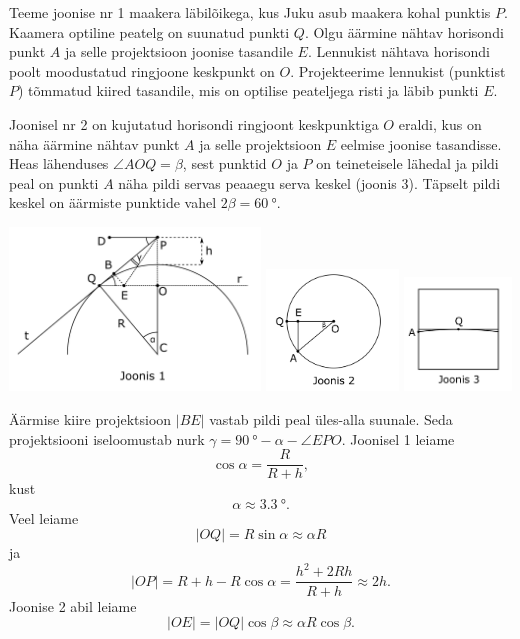 \documentclass[10pt]{article}
\begin{document}
Teeme joonise nr 1 maakera läbilõikega, kus Juku asub maakera kohal punktis $P$. Kaamera optiline peatelg on suunatud punkti $Q$. Olgu äärmine nähtav horisondi punkt $A$ ja selle projektsioon joonise tasandile $E$. Lennukist nähtava horisondi poolt moodustatud ringjoone keskpunkt on $O$. Projekteerime lennukist (punktist $P$) tõmmatud kiired tasandile, mis on optilise peateljega risti ja läbib punkti $E$.

Joonisel nr 2 on kujutatud horisondi ringjoont keskpunktiga $O$ eraldi, kus on näha äärmine nähtav punkt $A$ ja selle projektsioon $E$ eelmise joonise tasandisse. Heas lähenduses $\angle AOQ = \beta$, sest punktid $O$ ja $P$ on teineteisele lähedal ja pildi peal on punkti $A$ näha pildi servas peaaegu serva keskel (joonis 3). Täpselt pildi keskel on äärmiste punktide vahel $2\beta = \SI{60}{\degree}$.

\begin{center}
\includegraphics[width=0.50\textwidth]{2019-lahg-10-yl1.png}
\includegraphics[width=0.265\textwidth]{2019-lahg-10-yl2.png}
\includegraphics[width=0.215\textwidth]{2019-lahg-10-yl3.png}
\end{center}

Äärmise kiire projektsioon $|BE|$ vastab pildi peal üles-alla suunale. Seda projektsiooni iseloomustab nurk $\gamma=\SI{90}{\degree}-\alpha -\angle EPO$. 
Joonisel 1 leiame $$\cos{\alpha}=\frac{R}{R+h},$$ kust $$\alpha\approx\SI{3.3}{\degree}.$$ Veel leiame $$|OQ|=R\sin{\alpha}\approx \alpha R$$ ja $$|OP|=R+h-R\cos{\alpha}=\frac{h^2+2Rh}{R+h}\approx 2h.$$ Joonise 2 abil leiame $$|OE|=|OQ|\cos{\beta}\approx \alpha R\cos{\beta}.$$
\end{document}
